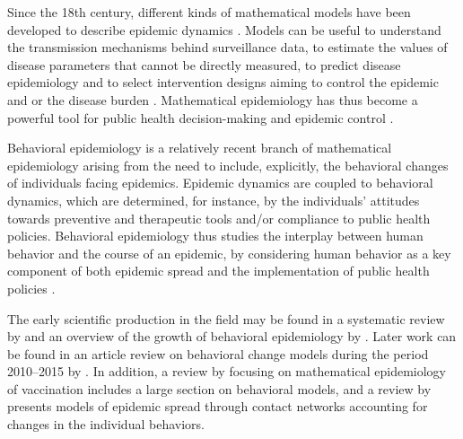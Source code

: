 Since the 18th century, different kinds of mathematical models have been developed to describe epidemic dynamics \cite[]{Brauer2017}. Models can be useful to understand the transmission mechanisms behind surveillance data, to estimate the values of disease parameters that cannot be directly measured, to predict disease epidemiology and to select intervention designs aiming to control the epidemic and or the disease burden \cite[]{Valleron2000}. Mathematical epidemiology has thus become a powerful tool for public health decision-making and epidemic control \cite[]{Valleron2000}. 

Behavioral epidemiology is a relatively recent branch of mathematical epidemiology arising from the need to include, explicitly, the behavioral changes of individuals facing epidemics. Epidemic dynamics are coupled to behavioral dynamics, which are determined, for instance, by the individuals' attitudes towards preventive and therapeutic tools and/or compliance to public health policies. Behavioral epidemiology thus studies the interplay between human behavior and the course of an epidemic, by considering human behavior as a key component of both epidemic spread and the implementation of public health policies \cite[]{Bauch2013}. 

The early scientific production in the field may be found in a systematic review by \cite{Funk2010} and an overview of the growth of behavioral epidemiology by \cite{Bauch2013}. Later work can be found in an article review on behavioral change models during the period 2010--2015 by \cite{Verelst2016}. In addition, a review by \cite{Wang2016} focusing on mathematical epidemiology of vaccination includes a large section on behavioral models, and a review by \cite{Wang2015} presents models of epidemic spread through contact networks accounting for changes in the individual behaviors.%

